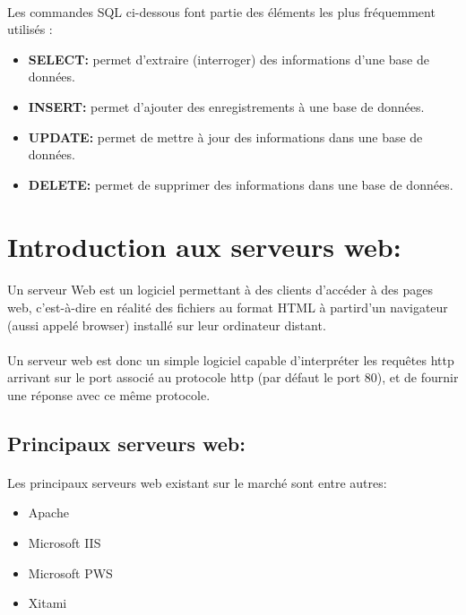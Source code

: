 \paragraph{}
Les commandes SQL ci-dessous font partie des éléments les plus
fréquemment utilisés :
\begin{itemize}
	\item \textmd {\textbf{SELECT:}} permet d’extraire (interroger) des informations d’une base de données.
	\item \textmd {\textbf{INSERT:}} permet d’ajouter des enregistrements à une base de données.
	\item \textmd {\textbf{UPDATE:}} permet de mettre à jour des informations dans une base de données.
	\item \textmd {\textbf{DELETE:}} permet de supprimer des informations dans une base de données.
\end{itemize}
\section{Introduction aux serveurs web:}
\paragraph{}
Un serveur Web est un logiciel permettant à des clients d'accéder à
des pages web, c'est-à-dire en réalité des fichiers au format HTML à partird'un navigateur (aussi appelé browser) installé sur leur ordinateur distant.
\paragraph{}
Un serveur web est donc un simple logiciel capable d'interpréter
les requêtes http arrivant sur le port associé au protocole http (par défaut le port 80), et de fournir une réponse avec ce même protocole.

\subsection{Principaux serveurs web:}
\paragraph{}
Les principaux serveurs web existant sur le marché sont entre autres:
\begin{itemize}
	\item Apache
	\item Microsoft IIS
	\item Microsoft PWS
	\item Xitami
\end{itemize}

